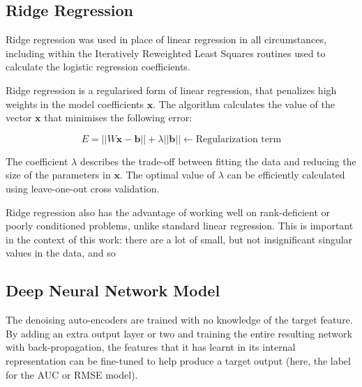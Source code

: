\documentclass{article}
\begin{document}
\subsection{Ridge Regression}

Ridge regression was used in place of linear regression in all circumstances, including within the Iteratively Reweighted Least Squares routines used to calculate the logistic regression coefficients.

Ridge regression is a regularised form of linear regression, that penalizes high weights in the model coefficients $\mathbf{x}$.  The algorithm calculates the value of the vector $\mathbf{x}$ that minimises the following error:

\begin{equation}
  E = ||W\mathbf{x} - \mathbf{b}|| + \lambda ||\mathbf{b}|| \leftarrow \mbox{Regularization term}
\end{equation}

The coefficient $\lambda$ describes the trade-off between fitting the data and reducing the size of the parameters in $\mathbf{x}$.  The optimal value of $\lambda$ can be efficiently calculated using leave-one-out cross validation.

Ridge regression also has the advantage of working well on rank-deficient or poorly conditioned problems, unlike standard linear regression.  
This is important in the context of this work: there are a lot of small, but not insignificant singular values in the data, and so 

\subsection{Deep Neural Network Model}

The denoising auto-encoders are trained with no knowledge of the target feature.
By adding an extra output layer or two and training the entire resulting network with back-propagation, the features that it has learnt in its internal representation can be fine-tuned to help produce a target output (here, the label for the AUC or RMSE model).
\end{document}
